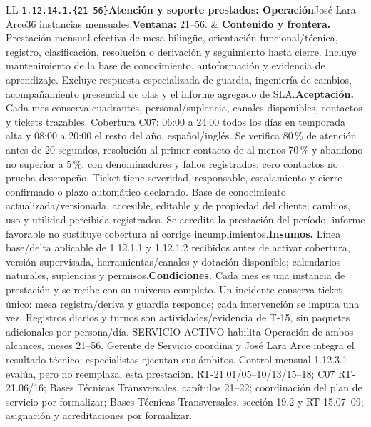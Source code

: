 \begin{longtable}{L{\tabcolsep\relax}L{\tabcolsep\relax}}
\texttt{1.\allowbreak{}12.\allowbreak{}14.\allowbreak{}1.\allowbreak{}\{21--56\}}\newline{}\textbf{Atención y soporte prestados: Operación}\newline{}José Lara Arce\newline{}36 instancias mensuales.\newline{}\textbf{Ventana:} 21--56. & \textbf{Contenido y frontera.} Prestación mensual efectiva de mesa bilingüe, orientación funcional/técnica, registro, clasificación, resolución o derivación y seguimiento hasta cierre. Incluye mantenimiento de la base de conocimiento, autoformación y evidencia de aprendizaje. Excluye respuesta especializada de guardia, ingeniería de cambios, acompañamiento presencial de olas y el informe agregado de SLA.\newline{}\textbf{Aceptación.} Cada mes conserva cuadrantes, personal/suplencia, canales disponibles, contactos y tickets trazables. Cobertura C07: 06:00 a 24:00 todos los días en temporada alta y 08:00 a 20:00 el resto del año, español/inglés. Se verifica 80\,\% de atención antes de 20 segundos, resolución al primer contacto de al menos 70\,\% y abandono no superior a 5\,\%, con denominadores y fallos registrados; cero contactos no prueba desempeño. Ticket tiene severidad, responsable, escalamiento y cierre confirmado o plazo automático declarado. Base de conocimiento actualizada/versionada, accesible, editable y de propiedad del cliente; cambios, uso y utilidad percibida registrados. Se acredita la prestación del período; informe favorable no sustituye cobertura ni corrige incumplimientos.\newline{}\textbf{Insumos.} Línea base/delta aplicable de 1.12.1.1 y 1.12.1.2 recibidos antes de activar cobertura, versión supervisada, herramientas/canales y dotación disponible; calendarios naturales, suplencias y permisos.\newline{}\textbf{Condiciones.} Cada mes es una instancia de prestación y se recibe con su universo completo. Un incidente conserva ticket único: mesa registra/deriva y guardia responde; cada intervención se imputa una vez. Registros diarios y turnos son actividades/evidencia de T-15, sin paquetes adicionales por persona/día. SERVICIO-ACTIVO habilita Operación de ambos alcances, meses 21--56. Gerente de Servicio coordina y José Lara Arce integra el resultado técnico; especialistas ejecutan sus ámbitos. Control mensual 1.12.3.1 evalúa, pero no reemplaza, esta prestación. RT-21.01/05--10/13/15--18; C07 RT-21.06/16; Bases Técnicas Transversales, capítulos 21--22; coordinación del plan de servicio por formalizar; Bases Técnicas Transversales, sección 19.2 y RT-15.07--09; asignación y acreditaciones por formalizar.\\\hline

\end{longtable}
